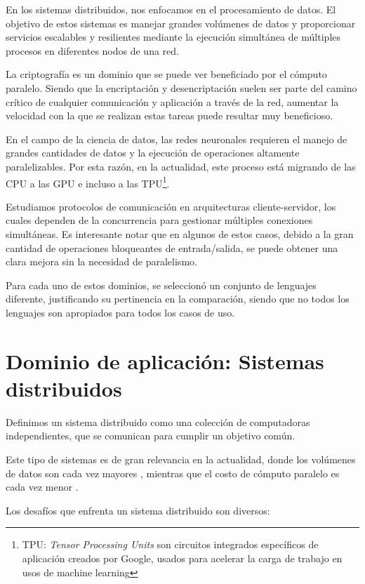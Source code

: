 \documentclass[11pt]{article}
\let\Oldsection\section
\renewcommand{\section}{\FloatBarrier\Oldsection}
\newcommand{\english}[1]{\textit{#1}}
\begin{document}
En los sistemas distribuidos, nos enfocamos en el procesamiento de datos. El objetivo de estos sistemas es manejar grandes volúmenes de datos y proporcionar servicios escalables y resilientes mediante la ejecución simultánea de múltiples procesos en diferentes nodos de una red.

La criptografía es un dominio que se puede ver beneficiado por el cómputo paralelo. Siendo que la encriptación y desencriptación suelen ser parte del camino crítico de cualquier comunicación y aplicación a través de la red, aumentar la velocidad con la que se realizan estas tareas puede resultar muy beneficioso.

En el campo de la ciencia de datos, las redes neuronales requieren el manejo de grandes cantidades de datos y la ejecución de operaciones altamente paralelizables. Por esta razón, en la actualidad, este proceso está migrando de las CPU a las GPU e incluso a las TPU\footnote{TPU: \english{Tensor Processing Units} son circuitos integrados específicos de aplicación creados por Google, usados para acelerar la carga de trabajo en usos de machine learning}.

Estudiamos protocolos de comunicación en arquitecturas cliente-servidor, los cuales dependen de la concurrencia para gestionar múltiples conexiones simultáneas. Es interesante notar que en algunos de estos casos, debido a la gran cantidad de operaciones bloqueantes de entrada/salida, se puede obtener una clara mejora sin la necesidad de paralelismo.

Para cada uno de estos dominios, se seleccionó un conjunto de lenguajes diferente, justificando su pertinencia en la comparación, siendo que no todos los lenguajes son apropiados para todos los casos de uso. 

\newpage

\section{Dominio de aplicación: Sistemas distribuidos}\label{sec:sis_dist}

Definimos un sistema distribuido como una colección de computadoras independientes, que se comunican para cumplir un objetivo común.

Este tipo de sistemas es de gran relevancia en la actualidad, donde los volúmenes de datos son cada vez mayores \cite{sis_dist:data_volume}, mientras que el costo de cómputo paralelo es cada vez menor \cite{sis_dist:compute_price}.

Los desafíos que enfrenta un sistema distribuido son diversos:
\end{document}
